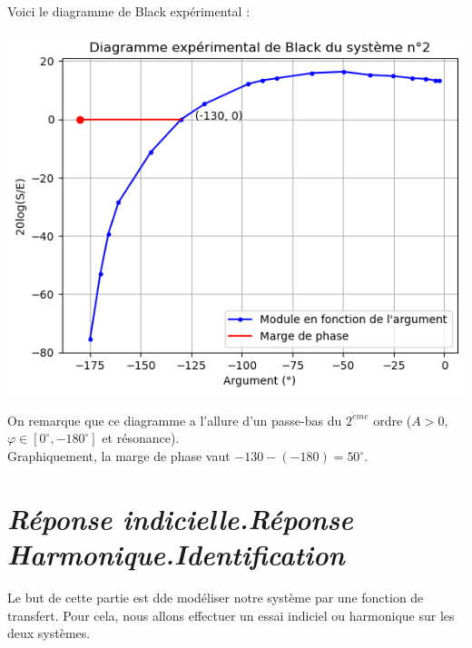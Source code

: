 \documentclass[12pt]{article}
\begin{document}
    Voici le diagramme de Black expérimental : 
    \begin{center}
        \includegraphics{Diagramme de Black experimental 2.1 Syst 2.png}
    \end{center}
    On remarque que ce diagramme a l'allure d'un passe-bas du $2^{\grave{e}me}$ ordre ($A > 0$, $\varphi \in [0^\circ,-180^\circ]$ et résonance).
    \\Graphiquement, la marge de phase vaut $-130 - (-180) = 50^\circ$.

    \section{\itshape Réponse indicielle.Réponse Harmonique.Identification}

    Le but de cette partie est dde modéliser notre système par une fonction de transfert. Pour cela, nous allons effectuer un essai indiciel ou harmonique sur les deux systèmes.
\end{document}
